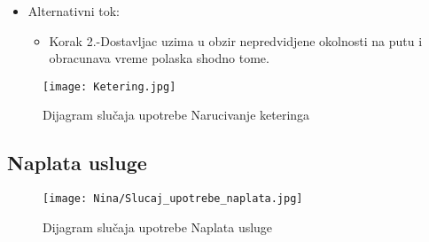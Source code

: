 \documentclass[a4paper]{article}
\begin{document}
      \begin{itemize}
        \item Alternativni tok:
          \begin{itemize}
        \item Korak 2.-Dostavljac uzima u obzir nepredvidjene okolnosti na putu i obracunava vreme polaska shodno tome.
    \end{itemize}
    \end{itemize}
    
\begin{figure}[htp]
    \centering
    \texttt{[image: Ketering.jpg]}
    \caption{Dijagram slučaja upotrebe Narucivanje keteringa}
    \label{fig:Ketering}
\end{figure}


\subsection{Naplata usluge}

\begin{figure}[H]
    \centering
    \texttt{[image: Nina/Slucaj\_upotrebe\_naplata.jpg]}
    \caption{Dijagram slučaja upotrebe Naplata usluge}
    \label{fig:RegistracijaZ}
\end{figure}
\end{document}
